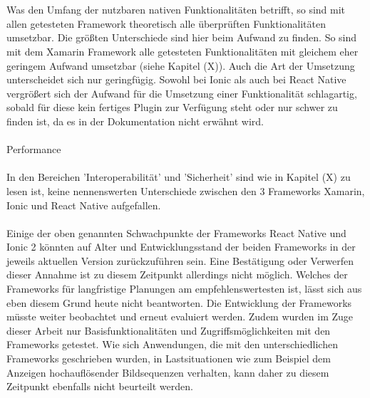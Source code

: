 \\
\\
Was den Umfang der nutzbaren nativen Funktionalitäten betrifft, so sind mit allen getesteten Framework theoretisch alle überprüften Funktionalitäten umsetzbar. Die größten Unterschiede sind hier beim Aufwand zu finden. So sind mit dem Xamarin Framework alle getesteten Funktionalitäten mit gleichem eher geringem Aufwand umsetzbar (siehe Kapitel (X)). Auch die Art der Umsetzung unterscheidet sich nur geringfügig. Sowohl bei Ionic als auch bei React Native vergrößert sich der Aufwand für die Umsetzung einer Funktionalität schlagartig, sobald für diese kein fertiges Plugin zur Verfügung steht oder nur schwer zu finden ist, da es in der Dokumentation nicht erwähnt wird.
\\
\\
Performance
\\
\\
In den Bereichen 'Interoperabilität' und 'Sicherheit' sind wie in Kapitel (X) zu lesen ist, keine nennenswerten Unterschiede zwischen den 3 Frameworks Xamarin, Ionic und React Native aufgefallen.
\\
\\
Einige der oben genannten Schwachpunkte der Frameworks React Native und Ionic 2 könnten auf Alter und Entwicklungsstand der beiden Frameworks in der jeweils aktuellen Version zurückzuführen sein. Eine Bestätigung oder Verwerfen dieser Annahme ist zu diesem Zeitpunkt allerdings nicht möglich. Welches der Frameworks für langfristige Planungen am empfehlenswertesten ist, lässt sich aus eben diesem Grund heute nicht beantworten. Die Entwicklung der Frameworks müsste weiter beobachtet und erneut evaluiert werden. Zudem wurden im Zuge dieser Arbeit nur Basisfunktionalitäten und Zugriffsmöglichkeiten mit den Frameworks getestet. Wie sich Anwendungen, die mit den unterschiedlichen Frameworks geschrieben wurden, in Lastsituationen wie zum Beispiel dem Anzeigen hochauflösender Bildsequenzen verhalten, kann daher zu diesem Zeitpunkt ebenfalls nicht beurteilt werden.